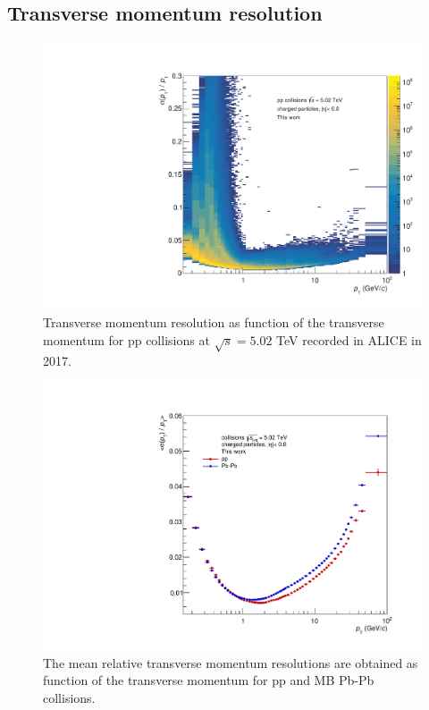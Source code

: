 \documentclass[12pt,a4paper]{report}
\begin{document}
\subsection{Transverse momentum resolution}
\begin{figure}[tb!]
\centering
\includegraphics[width=12cm]{Plots/ptReso2D.pdf}  
\caption{Transverse momentum resolution as function of the transverse momentum for pp collisions at $\sqrt{s} = 5.02$ TeV recorded in ALICE in 2017.}
\label{ptReso2D}
\end{figure}
\begin{figure}[tb!]
\centering
\includegraphics[width=12cm]{Plots/ptReso1D.pdf}  
\caption{The mean relative transverse momentum resolutions are obtained as function of the transverse momentum for pp and MB Pb-Pb collisions.}
\label{ptReso1D}
\end{figure}
\end{document}
